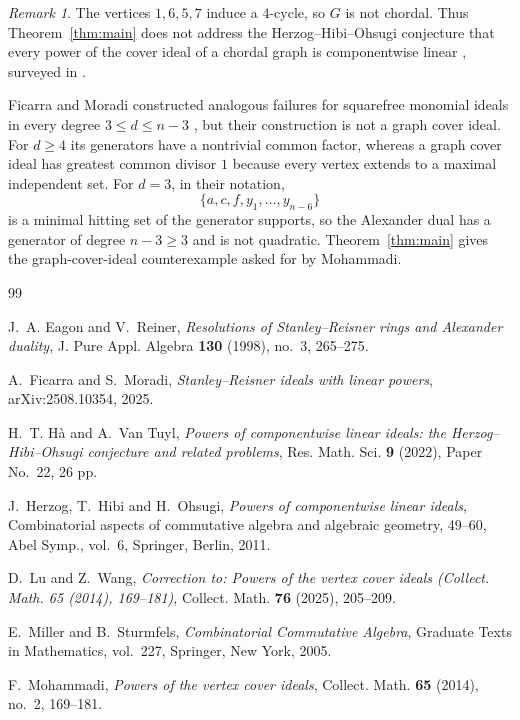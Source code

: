 \documentclass[11pt]{amsart}
\theoremstyle{remark}
\newtheorem{remark}[theorem]{Remark}
\begin{document}
\begin{remark}
The vertices $1,6,5,7$ induce a $4$-cycle, so $G$ is not chordal.
Thus Theorem~\ref{thm:main} does not address the Herzog--Hibi--Ohsugi
conjecture that every power of the cover ideal of a chordal graph is
componentwise linear \cite[Conjecture~2.5]{HHO2011}, surveyed in
\cite{HaVanTuyl}.

Ficarra and Moradi constructed analogous failures for squarefree
monomial ideals in every degree $3\leq d\leq n-3$
\cite[Theorem~D]{FicarraMoradi}, but their construction is not a graph
cover ideal.  For $d\geq4$ its generators have a nontrivial common
factor, whereas a graph cover ideal has greatest common divisor $1$
because every vertex extends to a maximal independent set.  For
$d=3$, in their notation,
\[
\{a,c,f,y_1,\ldots,y_{n-6}\}
\]
is a minimal hitting set of the generator supports, so the Alexander
dual has a generator of degree $n-3\geq3$ and is not quadratic.
Theorem~\ref{thm:main} gives the graph-cover-ideal counterexample asked
for by Mohammadi.
\end{remark}

\begin{thebibliography}{99}

J.~A. Eagon and V.~Reiner,
\emph{Resolutions of Stanley--Reisner rings and Alexander duality},
J. Pure Appl. Algebra \textbf{130} (1998), no.~3, 265--275.

A.~Ficarra and S.~Moradi,
\emph{Stanley--Reisner ideals with linear powers},
arXiv:2508.10354, 2025.

H.~T. H\`a and A.~Van Tuyl,
\emph{Powers of componentwise linear ideals:
the Herzog--Hibi--Ohsugi conjecture and related problems},
Res. Math. Sci. \textbf{9} (2022), Paper No.~22, 26 pp.

J.~Herzog, T.~Hibi and H.~Ohsugi,
\emph{Powers of componentwise linear ideals},
Combinatorial aspects of commutative algebra and algebraic geometry,
49--60, Abel Symp., vol.~6, Springer, Berlin, 2011.

D.~Lu and Z.~Wang,
\emph{Correction to: Powers of the vertex cover ideals
(Collect. Math. 65 (2014), 169--181)},
Collect. Math. \textbf{76} (2025), 205--209.

E.~Miller and B.~Sturmfels,
\emph{Combinatorial Commutative Algebra},
Graduate Texts in Mathematics, vol.~227,
Springer, New York, 2005.

F.~Mohammadi,
\emph{Powers of the vertex cover ideals},
Collect. Math. \textbf{65} (2014), no.~2, 169--181.

\end{thebibliography}
\end{document}

